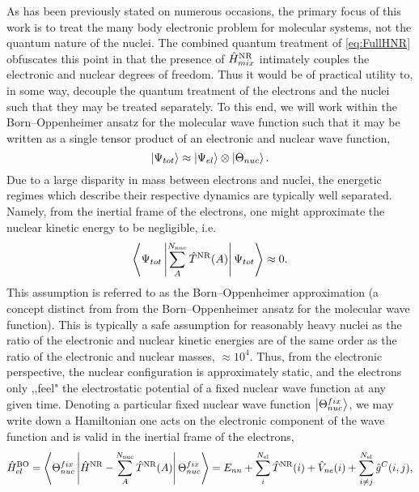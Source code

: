 As has been previously stated on numerous occasions, the primary focus of this work is to treat the many body
electronic problem for molecular systems, not the quantum nature of the nuclei. The combined quantum treatment
of \cref{eq:FullHNR} obfuscates this point in that the presence of $\hat{H}^{\mathrm{NR}}_{mix}$ intimately couples the
electronic and nuclear degrees of freedom. Thus it would be of practical utility to, in some way, decouple
the quantum treatment of the electrons and the nuclei such that they may be treated separately. 
To this end, we will work within the Born--Oppenheimer ansatz for the molecular wave function \cite{Oppenheimer27_457,Tully98_407} such
that it may be written as a single tensor product of an electronic and nuclear wave function,
\begin{equation}
  \left\vert \Psi_{tot} \right\rangle \approx \left\vert \Psi_{el} \right\rangle \otimes \left\vert \Theta_{nuc} \right\rangle.
\end{equation}
Due to a large disparity in mass between electrons and nuclei, the energetic regimes which describe their respective
dynamics are typically well separated. Namely, from the inertial frame of the electrons, one might approximate
the nuclear kinetic energy to be negligible, i.e.
\begin{equation}
\left\langle \Psi_{tot} \left\vert \sum_A^{N_\mathrm{nuc}} \hat{T}^{\mathrm{NR}}(A)  \right\vert \Psi_{tot} \right\rangle \approx 0.
\end{equation}
This assumption is referred to as the Born--Oppenheimer approximation (a concept distinct from from the 
Born--Oppenheimer ansatz for the molecular wave function). This is typically a safe assumption for reasonably
heavy nuclei as the ratio of the electronic and nuclear kinetic energies are of the same order as
the ratio of the electronic and nuclear masses, $\approx 10^{4}$. Thus, from the electronic perspective,
the nuclear configuration is approximately static, and the electrons only ,,feel" the electrostatic
potential of a fixed nuclear wave function at any given time. Denoting a particular fixed nuclear wave
function $\left\vert \Theta_{nuc}^{fix} \right\rangle$, we may write down a Hamiltonian one acts on the electronic 
component of the wave function and is valid in the inertial frame of the electrons,
\begin{equation}
\label{eq:NRBOH}
\hat{H}^{\mathrm{BO}}_{el} = \left\langle \Theta_{nuc}^{fix} \left\vert \hat{H}^{\mathrm{NR}} - \sum_A^{N_\mathrm{nuc}}\hat{T}^{\mathrm{NR}}(A) \right\vert \Theta_{nuc}^{fix} \right\rangle
=E_{nn} + \sum_i^{N_\mathrm{el}} \hat{T}^{\mathrm{NR}}(i) + \hat{V}_{ne}(i) + \sum_{i\neq j}^{N_\mathrm{el}} \hat{g}^C(i,j),
\end{equation}
